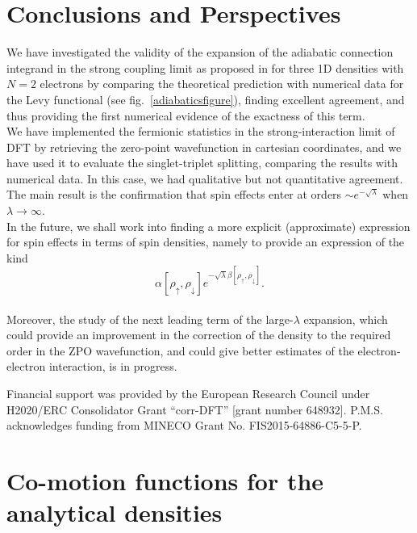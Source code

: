 \documentclass[aps,pra,twocolumn,superscriptaddress]{revtex4}
\begin{document}
\section{Conclusions and Perspectives}
\label{sec:conclusions}
We have investigated the validity of the expansion of the adiabatic connection integrand in the strong coupling limit as proposed in \citep{GorVigSei-JCTC-09} for three 1D densities with $N=2$ electrons by comparing the theoretical prediction with numerical data for the Levy functional (see fig.~\ref{adiabaticsfigure}), finding excellent agreement, and thus providing the first numerical evidence of the exactness of this term. \\ We have implemented the fermionic  statistics in the strong-interaction limit of DFT by retrieving the zero-point wavefunction in cartesian coordinates, and we have used it to evaluate the singlet-triplet splitting, comparing the results with numerical data. In this case, we had qualitative but not quantitative agreement. The main result is the confirmation that spin effects enter at orders $\sim e^{-\sqrt{\lambda}}$ when $\lambda\to\infty$.\\
In the future, we shall work into finding a more explicit (approximate) expression for spin effects in terms of spin densities, namely to provide an expression of the kind \begin{equation}\alpha[\rho_\uparrow,\rho_\downarrow]e^{-\sqrt{\lambda}\beta[\rho_\uparrow,\rho_\downarrow]}.
\end{equation}\\ Moreover, the study of the next leading term of the large-$\lambda$ expansion, which could provide an improvement in the correction of the density to the required order in the ZPO wavefunction, and could give better estimates of the electron-electron interaction, is in progress.

\begin{acknowledgments}
	Financial support was provided by the European Research Council under H2020/ERC Consolidator Grant “corr-DFT” [grant number 648932]. P.M.S. acknowledges funding from MINECO Grant No. FIS2015-64886-C5-5-P.
\end{acknowledgments}

\appendix
\section{Co-motion functions for the analytical densities}\label{analyticomotion}
\end{document}
